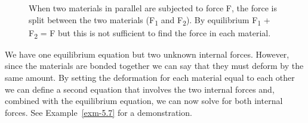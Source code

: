 \documentclass[
  letterpaper,
  DIV=11,
  numbers=noendperiod]{scrreprt}
\theoremstyle{definition}
\theoremstyle{remark}
\begin{document}
\begin{figure}


\caption{\label{fig-5.13}When two materials in parallel are subjected to
force F, the force is split between the two materials
(F\textsubscript{1} and F\textsubscript{2}). By equilibrium
F\textsubscript{1} + F\textsubscript{2} = F but this is not sufficient
to find the force in each material.}

\end{figure}%

We have one equilibrium equation but two unknown internal forces.
However, since the materials are bonded together we can say that they
must deform by the same amount. By setting the deformation for each
material equal to each other we can define a second equation that
involves the two internal forces and, combined with the equilibrium
equation, we can now solve for both internal forces. See
Example~\ref{exm-5.7} for a demonstration.
\end{document}
